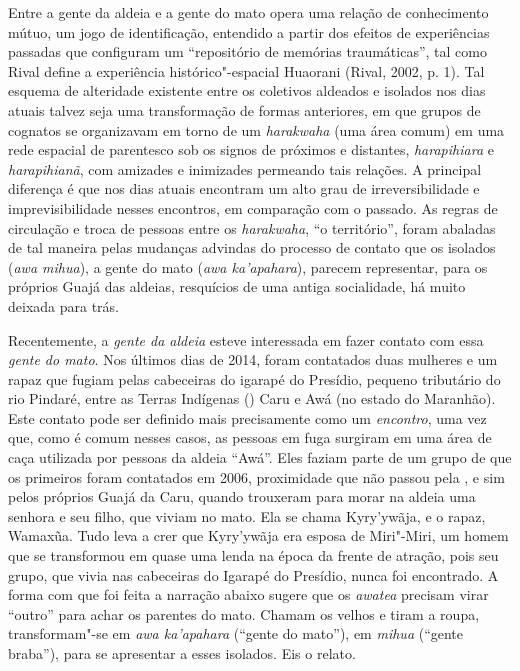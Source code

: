 Entre a gente da aldeia e a gente do mato opera uma relação de
conhecimento mútuo, um jogo de identificação, entendido a partir dos
efeitos de experiências passadas que configuram um ``repositório de
memórias traumáticas'', tal como Rival define a experiência
histórico"-espacial Huaorani (Rival, 2002, p. 1). Tal esquema de alteridade
existente entre os coletivos aldeados e isolados nos dias atuais talvez
seja uma transformação de formas anteriores, em que grupos de cognatos
se organizavam em torno de um \emph{harakwaha} (uma área comum) em uma
rede espacial de parentesco sob os signos de próximos e distantes,
\emph{harapihiara} e \emph{harapihianã}, com amizades e inimizades
permeando tais relações. A principal diferença é que nos dias atuais
encontram um alto grau de irreversibilidade e imprevisibilidade nesses
encontros, em comparação com o passado. As regras de circulação e troca
de pessoas entre os \emph{harakwaha}, ``o território'', foram abaladas de
tal maneira pelas mudanças advindas do processo de contato que os
isolados (\emph{awa mihua}), a gente do mato (\emph{awa ka'apahara}),
parecem representar, para os próprios Guajá das aldeias, resquícios de
uma antiga socialidade, há muito deixada para trás.

Recentemente, a \emph{gente da aldeia} esteve interessada em fazer
contato com essa \emph{gente do mato}. Nos últimos dias de 2014, foram
contatados duas mulheres e um rapaz que fugiam pelas cabeceiras do
igarapé do Presídio, pequeno tributário do rio Pindaré, entre as Terras
Indígenas () Caru e Awá (no estado do Maranhão). Este contato pode ser
definido mais precisamente como um \emph{encontro}, uma vez que, como é
comum nesses casos, as pessoas em fuga surgiram em uma área de caça
utilizada por pessoas da aldeia ``Awá''. Eles faziam parte de um grupo
de que os primeiros foram contatados em 2006, proximidade que não passou
pela , e sim pelos próprios Guajá da  Caru, quando trouxeram para
morar na aldeia uma senhora e seu filho, que viviam no mato. Ela se
chama Kyry'ywãja, e o rapaz, Wamaxũa. Tudo leva a crer que Kyry'ywãja
era esposa de Miri"-Miri, um homem que se transformou em quase uma lenda
na época da frente de atração, pois seu grupo, que vivia nas cabeceiras
do Igarapé do Presídio, nunca foi encontrado. A forma com que foi feita
a narração abaixo sugere que os \emph{awatea} precisam virar ``outro''
para achar os parentes do mato. Chamam os velhos e tiram a roupa,
transformam"-se em \emph{awa ka'apahara} (``gente do mato''), em
\emph{mihua} (``gente braba''), para se apresentar a esses isolados. Eis
o relato.

